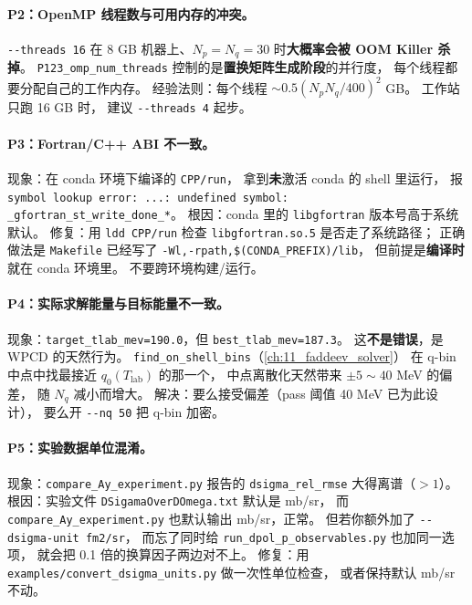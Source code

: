\paragraph{P2：OpenMP 线程数与可用内存的冲突。}
\texttt{-{}-threads 16} 在 8 GB 机器上、$N_p = N_q = 30$ 时\textbf{大概率会被 OOM Killer 杀掉}。
\texttt{P123\_omp\_num\_threads} 控制的是\textbf{置换矩阵生成阶段}的并行度，
每个线程都要分配自己的工作内存。
经验法则：每个线程 $\sim 0.5 (N_p N_q / 400)^{2}$ GB。
工作站只跑 16 GB 时，
建议 \texttt{-{}-threads 4} 起步。

\paragraph{P3：Fortran/C++ ABI 不一致。}
现象：在 conda 环境下编译的 \texttt{CPP/run}，
拿到\textbf{未}激活 conda 的 shell 里运行，
报 \texttt{symbol lookup error: ...: undefined symbol: \_gfortran\_st\_write\_done\_*}。
根因：conda 里的 \texttt{libgfortran} 版本号高于系统默认。
修复：用 \texttt{ldd CPP/run} 检查 \texttt{libgfortran.so.5} 是否走了系统路径；
正确做法是 \texttt{Makefile} 已经写了
\texttt{-Wl,-rpath,\$(CONDA\_PREFIX)/lib}，
但前提是\textbf{编译时}就在 conda 环境里。
不要跨环境构建/运行。

\paragraph{P4：实际求解能量与目标能量不一致。}
现象：\texttt{target\_tlab\_mev=190.0}，但 \texttt{best\_tlab\_mev=187.3}。
这\textbf{不是错误}，是 WPCD 的天然行为。
\texttt{find\_on\_shell\_bins}（\cref{ch:11_faddeev_solver}）
在 q-bin 中点中找最接近 $q_0(T_{\mathrm{lab}})$ 的那一个，
中点离散化天然带来 $\pm 5\sim 40$ MeV 的偏差，
随 $N_q$ 减小而增大。
解决：要么接受偏差（pass 阈值 40 MeV 已为此设计），
要么开 \texttt{-{}-nq 50} 把 q-bin 加密。

\paragraph{P5：实验数据单位混淆。}
现象：\texttt{compare\_Ay\_experiment.py} 报告的 \texttt{dsigma\_rel\_rmse} 大得离谱（$> 1$）。
根因：实验文件 \texttt{DSigamaOverDOmega.txt} 默认是 mb/sr，
而 \texttt{compare\_Ay\_experiment.py} 也默认输出 mb/sr，正常。
但若你额外加了 \texttt{-{}-dsigma-unit fm2/sr}，
而忘了同时给 \texttt{run\_dpol\_p\_observables.py} 也加同一选项，
就会把 0.1 倍的换算因子两边对不上。
修复：用 \texttt{examples/convert\_dsigma\_units.py} 做一次性单位检查，
或者保持默认 mb/sr 不动。


